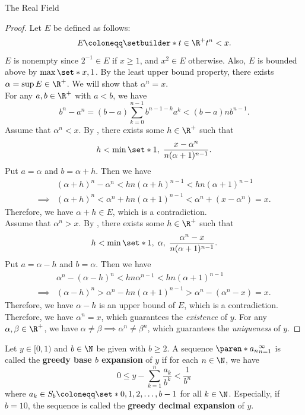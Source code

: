\begin{section}{The Real Field}
\begin{proof}
    Let $E$ be defined as follows:
    \[
    E \coloneqq \setbuilder*{t \in \R^{+}}{t^{n} < x}.
    \]
    $E$ is nonempty since $2^{-1} \in E$ if $x\geq 1$, and $x^{2} \in E$ otherwise.
    Also, $E$ is bounded above by $\max\set*{x, 1}$. By the least upper bound property,
    there exists $\alpha = \sup E \in \R^{+}$. We will show that $\alpha^{n} = x$.
    \\[6mm]
    For any $a, b \in \R^{+}$ with $a < b$, we have
    \[
    b^{n} - a^{n} = (b - a)\sum_{k = 0}^{n - 1} b^{n - 1 - k} a^{k} < (b - a)nb^{n - 1}.
    \]
    Assume that $\alpha^{n} < x$. By , there exists some $h \in \R^{+}$ such that
    \[
    h < \min\set*{1, \; \frac{x - \alpha^{n}}{n(\alpha + 1)^{n - 1}}}.
    \]
    Put $a = \alpha$ and $b = \alpha + h$. Then we have
    \begin{align*}
        &(\alpha + h)^{n} - \alpha^{n} < hn(\alpha + h)^{n - 1} < hn(\alpha + 1)^{n - 1} \\
        \implies &(\alpha + h)^{n} < \alpha^{n} + hn(\alpha + 1)^{n - 1} < \alpha^{n} + (x - \alpha^{n}) = x.
    \end{align*}
    Therefore, we have $\alpha + h \in E$, which is a contradiction.
    \\[6mm]
    Assume that $\alpha^{n} > x$. By , there exists some $h \in \R^{+}$ such that
    \[
    h < \min\set*{1, \; \alpha, \; \frac{\alpha^{n} - x}{n(\alpha + 1)^{n - 1}}}.
    \]
    Put $a = \alpha - h$ and $b = \alpha$. Then we have
    \begin{align*}
        &\alpha^{n} - (\alpha - h)^{n} < hn\alpha^{n - 1} < hn(\alpha + 1)^{n - 1} \\
        \implies &(\alpha - h)^{n} > \alpha^{n} - hn(\alpha + 1)^{n - 1} > \alpha^{n} - (\alpha^{n} - x) = x.
    \end{align*}
    Therefore, we have $\alpha - h$ is an upper bound of $E$, which is a contradiction.
    \\[6mm]
    Therefore, we have $\alpha^{n} = x$, which guarantees the \emph{existence} of $y$. For any $\alpha, \beta \in \R^{+}$,
    we have $\alpha \neq \beta \implies \alpha^{n} \neq \beta^{n}$, which guarantees the \emph{uniqueness} of $y$.
\end{proof}

\bigskip

\begin{definition} \label{def:GreedyBaseExpansionOfRealNumbers}
    Let $y \in [0, 1)$ and $b \in \N$ be given with $b \geq 2$. A sequence $\paren*{a_{n}}_{n = 1}^{\infty}$
    is called the \textbf{greedy base $b$ expansion} of $y$ if for each $n \in \N$, we have
    \[
    0 \leq y - \sum_{k = 1}^{n} \frac{a_{k}}{b^{k}} < \frac{1}{b^{n}}
    \]
    where $a_{k} \in S_{b} \coloneqq \set*{0, 1, 2, \dots, b - 1}$ for all $k \in \N$.
    Especially, if $b = 10$, the sequence is called the \textbf{greedy decimal expansion} of $y$.
\end{definition}


\end{section}
